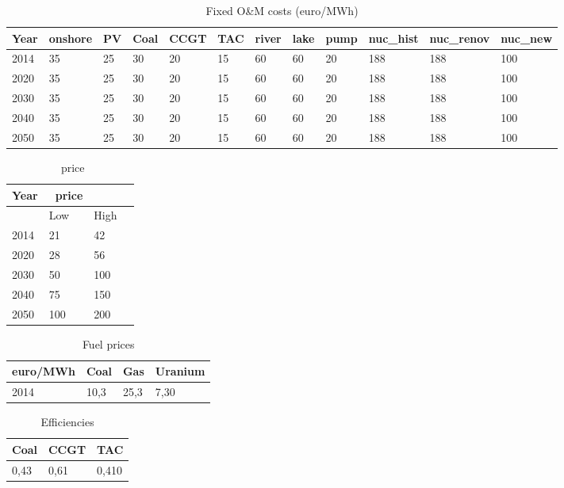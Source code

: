 \begin{table}[!ht]
	\centering
	\caption{Fixed O\&M costs (euro/MWh)}
	\label{tab:OM_costs}
		\begin{adjustbox}{width=1\textwidth}
	\small
	\begin{tabular}{llllllllllll}
		\toprule
		Year & onshore & PV & Coal & CCGT & TAC & river & lake & pump & nuc\_hist & nuc\_renov & nuc\_new \\
		\midrule
		2014 & 35 & 25 & 30 & 20 & 15 & 60 & 60 & 20 & 188 & 188 & 100 \\
		2020 & 35 & 25 & 30 & 20 & 15 & 60 & 60 & 20 & 188 & 188 & 100 \\
		2030 & 35 & 25 & 30 & 20 & 15 & 60 & 60 & 20 & 188 & 188 & 100 \\
		2040 & 35 & 25 & 30 & 20 & 15 & 60 & 60 & 20 & 188 & 188 & 100 \\
		2050 & 35 & 25 & 30 & 20 & 15 & 60 & 60 & 20 & 188 & 188 & 100 \\
		\bottomrule
	\end{tabular}
\end{adjustbox}
\end{table}


\begin{table}
	\centering
	\caption{\coo\ price}
	\label{tab:CO2_price}
	\begin{tabular}{llll}
		\toprule
		Year & \coo\ price & & \\
		\midrule
		& Low & High \\
		2014 & 21 & 42 \\
		2020 & 28 & 56 \\
		2030 & 50 & 100 \\
		2040 & 75 & 150 \\
		2050 & 100 & 200 \\
		\bottomrule
	\end{tabular}
\end{table}



\begin{table}[!ht]
	\centering
	\caption{Fuel prices}
	\label{tab:Fuel_prices}
	\begin{tabular}{llll}
		\toprule
		euro/MWh & Coal & Gas & Uranium \\
		\midrule
		2014 & 10,3 & 25,3 & 7,30 \\
		\bottomrule
	\end{tabular}
\end{table}

\begin{table}
	\centering
	\caption{Efficiencies}
	\label{tab:Efficiencies}
	\begin{tabular}{lll}
		\toprule
		Coal & CCGT & TAC \\
		\midrule
		0,43 & 0,61 & 0,410 \\
		\bottomrule
	\end{tabular}
\end{table}

